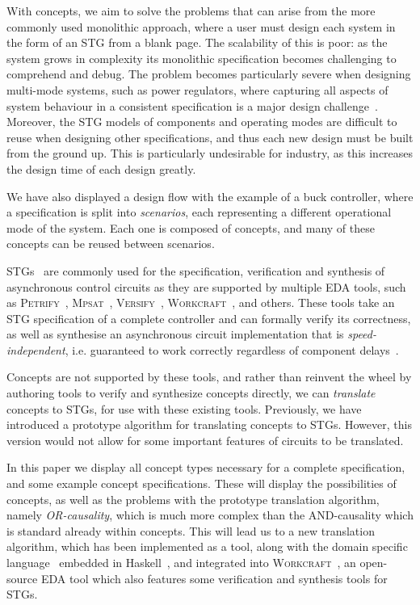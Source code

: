 \documentclass[british, journal]{IEEEtran}
\newcommand{\noun}[1]{\textsc{#1}}
\begin{document}
With concepts, we aim to solve the problems that can arise from the more commonly used
monolithic approach, where a user must design each system in the form of an STG from a blank page. 
The scalability of this is poor: as the system grows in complexity its monolithic specification becomes 
challenging to comprehend and debug. The problem becomes particularly severe when designing 
multi-mode systems, such as power regulators, where capturing all aspects of system behaviour in a
consistent specification is a major design challenge~\cite{2014_sokolov_ftfc}\cite{sokolov2015design}. 
Moreover, the STG models of components and  operating modes are difficult to reuse when designing 
other specifications, and thus each new design must be built from the ground up. This is particularly 
undesirable for industry, as this increases the design time of each design greatly. 

We have also displayed a design flow with the example of a buck controller, where a specification is 
split into \textit{scenarios}, each representing a different operational mode of the system. 
Each one is composed of concepts, and many of these concepts can be reused between 
scenarios.

STGs~\cite{Chu_1987_phd}\cite{Rosenblum_1985_tpn}
are commonly used for the specification,
verification and synthesis of asynchronous control circuits as they are
supported by multiple EDA tools, such as \noun{Petrify}~\cite{Cortadella},
\noun{Mpsat}~\cite{khomenko2004detecting}, \noun{Versify}~\cite{i1997formal},
\noun{Workcraft}~\cite{2007_poliakov_workcraft}\cite{Workcraft_website}, and
others.
These tools take an STG specification of a complete controller and can
formally verify its correctness, as well as synthesise an asynchronous
circuit implementation that is \emph{speed-independent}, i.e. guaranteed
to work correctly regardless of component delays~\cite{Muller_1959_ts}.

Concepts are not supported by these tools, and rather than reinvent the wheel by authoring tools
to verify and synthesize concepts directly, we can \emph{translate} concepts to STGs, for use with 
these existing tools. Previously, we have introduced a prototype algorithm for translating concepts
to STGs. However, this version would not allow for some important features of circuits to be
translated. 

In this paper we display all concept types necessary for a complete specification, and some 
example concept specifications. These will display the possibilities of concepts, as well as the 
problems with the prototype translation algorithm, namely \emph{OR-causality}, which is 
much more complex than the AND-causality which is standard already within concepts. 
This will lead us to a new translation algorithm, which has been implemented as a tool, 
along with the domain specific language~\cite{2016_concepts_github} embedded in 
Haskell~\cite{1996_hudak_dsl}, and integrated into 
\noun{Workcraft}~\cite{Workcraft_website}, an open-source EDA tool which also 
features some verification and synthesis tools for STGs. 
\end{document}
